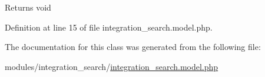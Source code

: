 \begin{DoxyReturn}{Returns}
void 
\end{DoxyReturn}


Definition at line 15 of file integration\+\_\+search.\+model.\+php.



The documentation for this class was generated from the following file\+:\begin{DoxyCompactItemize}
\item 
modules/integration\+\_\+search/\hyperlink{integration__search_8model_8php}{integration\+\_\+search.\+model.\+php}\end{DoxyCompactItemize}

